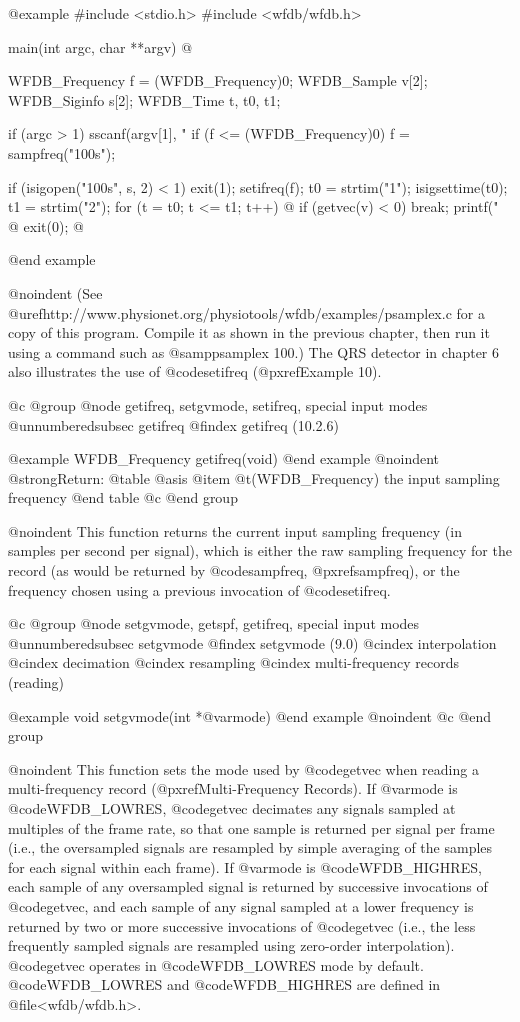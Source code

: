 {{{{{{{{{@example
#include <stdio.h>
#include <wfdb/wfdb.h>

main(int argc, char **argv)
@{
    WFDB_Frequency f = (WFDB_Frequency)0;
    WFDB_Sample v[2];
    WFDB_Siginfo s[2];
    WFDB_Time t, t0, t1;

    if (argc > 1) sscanf(argv[1], "%
    if (f <= (WFDB_Frequency)0) f = sampfreq("100s");

    if (isigopen("100s", s, 2) < 1)
        exit(1);
    setifreq(f);
    t0 = strtim("1");
    isigsettime(t0);
    t1 = strtim("2");
    for (t = t0; t <= t1; t++) @{
        if (getvec(v) < 0)
            break;
        printf("%
    @}
    exit(0);
@}
@end example

@noindent
(See @uref{http://www.physionet.org/physiotools/wfdb/examples/psamplex.c} for a
copy of this program.  Compile it as shown in the previous chapter, then run it
using a command such as @samp{psamplex 100}.)  The QRS detector in chapter 6
also illustrates the use of @code{setifreq} (@pxref{Example 10}).

@c @group
@node     getifreq, setgvmode, setifreq, special input modes
@unnumberedsubsec getifreq
@findex getifreq (10.2.6)

@example
WFDB_Frequency getifreq(void)
@end example
@noindent
@strong{Return:}
@table @asis
@item @t{(WFDB_Frequency)}
the input sampling frequency
@end table
@c @end group

@noindent
This function returns the current input sampling frequency (in samples
per second per signal), which is either the raw sampling frequency for
the record (as would be returned by @code{sampfreq}, @pxref{sampfreq}),
or the frequency chosen using a previous invocation of @code{setifreq}.

@c @group
@node     setgvmode, getspf, getifreq, special input modes
@unnumberedsubsec setgvmode
@findex setgvmode (9.0)
@cindex interpolation
@cindex decimation
@cindex resampling
@cindex multi-frequency records (reading)

@example
void setgvmode(int *@var{mode})
@end example
@noindent
@c @end group

@noindent
This function sets the mode used by @code{getvec} when reading a
multi-frequency record (@pxref{Multi-Frequency Records}).  If @var{mode} is
@code{WFDB_LOWRES}, @code{getvec} decimates any signals sampled at multiples of
the frame rate, so that one sample is returned per signal per frame (i.e., the
oversampled signals are resampled by simple averaging of the samples for each
signal within each frame).  If @var{mode} is @code{WFDB_HIGHRES}, each sample
of any oversampled signal is returned by successive invocations of
@code{getvec}, and each sample of any signal sampled at a lower frequency is
returned by two or more successive invocations of @code{getvec} (i.e., the less
frequently sampled signals are resampled using zero-order interpolation).
@code{getvec} operates in @code{WFDB_LOWRES} mode by default.
@code{WFDB_LOWRES} and @code{WFDB_HIGHRES} are defined in @file{<wfdb/wfdb.h>}.

}}}}}}}}}
